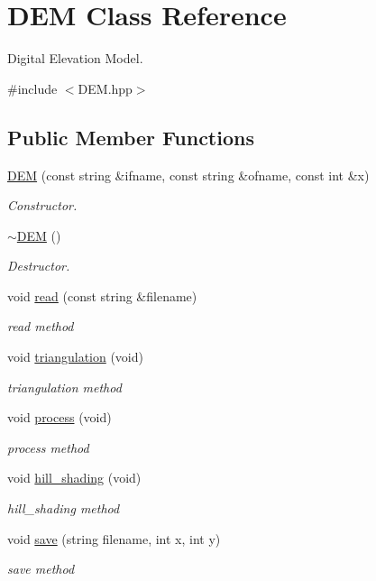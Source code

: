 \hypertarget{classDEM}{}\section{D\+EM Class Reference}
\label{classDEM}


Digital Elevation Model.  




{\ttfamily \#include $<$D\+E\+M.\+hpp$>$}

\subsection*{Public Member Functions}
\begin{DoxyCompactItemize}
\item 
\hyperlink{classDEM_a64156558bc796710150012bf7873a2ad}{D\+EM} (const string \&ifname, const string \&ofname, const int \&x)
\begin{DoxyCompactList}\small\item\em Constructor. \end{DoxyCompactList}\item 
\hyperlink{classDEM_abd0e17d348572bcb75f94a23652828fc}{$\sim$\+D\+EM} ()
\begin{DoxyCompactList}\small\item\em Destructor. \end{DoxyCompactList}\item 
void \hyperlink{classDEM_aa335c6a15872db8075dcfc2074bc24a1}{read} (const string \&filename)
\begin{DoxyCompactList}\small\item\em read method \end{DoxyCompactList}\item 
void \hyperlink{classDEM_aadcc1b7e58d927d53d98356ad564ff30}{triangulation} (void)
\begin{DoxyCompactList}\small\item\em triangulation method \end{DoxyCompactList}\item 
void \hyperlink{classDEM_a1a9c426ce0626fea4f066b73c7045e6f}{process} (void)
\begin{DoxyCompactList}\small\item\em process method \end{DoxyCompactList}\item 
void \hyperlink{classDEM_ae5972d803d7f32e640fb732d4a98dfcf}{hill\+\_\+shading} (void)
\begin{DoxyCompactList}\small\item\em hill\+\_\+shading method \end{DoxyCompactList}\item 
void \hyperlink{classDEM_a6cb0c96b5a5b2d7c0f7ac07377a64dbd}{save} (string filename, int x, int y)
\begin{DoxyCompactList}\small\item\em save method \end{DoxyCompactList}\end{DoxyCompactItemize}
